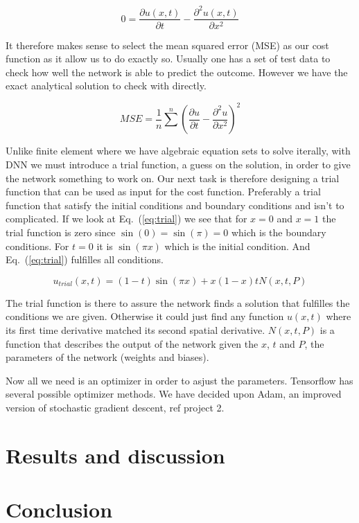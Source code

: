 \documentclass[a4paper, twocolumn]{article}
\newcommand{\eq} [1]{Eq.\ (\ref{eq:#1})}
\begin{document}
\begin{equation} \label{eq:diff_0}
0 = \frac{\partial u(x,t)}{\partial t} - \frac{\partial^2 u(x,t)}{\partial x^2} 
\end{equation}

It therefore makes sense to select the mean squared error (MSE) as our cost function as it allow us to do exactly so. Usually one has a set of test data to check how well the network is able to predict the outcome. However we have the exact analytical solution to check with directly.

\begin{equation}
MSE = \frac{1}{n} \sum^n \left( \frac{\partial u}{\partial t} - \frac{\partial^2 u}{\partial x^2} \right)^2
\end{equation}

Unlike finite element where we have algebraic equation sets to solve iterally, with DNN we must introduce a trial function, a guess on the solution, in order to give the network something to work on. 
Our next task is therefore designing a trial function that can be used as input for the cost function. Preferably a trial function that satisfy the initial conditions and boundary conditions and isn't to complicated. If we look at \eq{trial} we see that for $x = 0$ and $x = 1$ the trial function is zero since $\sin (0) = \sin (\pi) = 0$ which is the boundary conditions. For $t = 0$ it is $\sin(\pi x)$ which is the initial condition. And \eq{trial} fulfilles all conditions.

\begin{equation} \label{eq:trial}
u_{trial}(x,t) = (1 - t)\sin (\pi x) + x(1 - x)tN(x, t, P)
\end{equation}

The trial function is there to assure the network finds a solution that fulfilles the conditions we are given. Otherwise it could just find any function $u(x,t)$ where its first time derivative matched its second spatial derivative. $N(x,t,P)$ is a function that describes the output of the network given the $x$, $t$ and $P$, the parameters of the network (weights and biases). 

Now all we need is an optimizer in order to asjust the parameters. Tensorflow has several possible optimizer methods. We have decided upon Adam, an improved version of stochastic gradient descent, ref project 2. 

\section{Results and discussion}
\lipsum[6]

\section{Conclusion}
\lipsum[7]


\onecolumn{
\printbibliography
}
\end{document}
